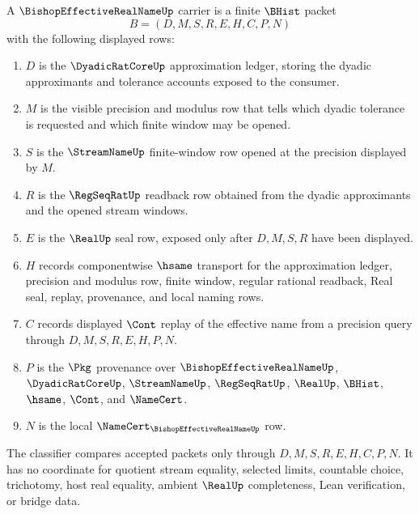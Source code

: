 \begin{definition}
\label{def:bishop-effective-real-name-carrier}
A $\BishopEffectiveRealNameUp$ carrier is a finite $\BHist$ packet
$$
B=(D,M,S,R,E,H,C,P,N)
$$
with the following displayed rows:
\begin{enumerate}
\item $D$ is the $\DyadicRatCoreUp$ approximation ledger, storing the dyadic approximants and tolerance accounts exposed to the consumer.
\item $M$ is the visible precision and modulus row that tells which dyadic tolerance is requested and which finite window may be opened.
\item $S$ is the $\StreamNameUp$ finite-window row opened at the precision displayed by $M$.
\item $R$ is the $\RegSeqRatUp$ readback row obtained from the dyadic approximants and the opened stream windows.
\item $E$ is the $\RealUp$ seal row, exposed only after $D,M,S,R$ have been displayed.
\item $H$ records componentwise $\hsame$ transport for the approximation ledger, precision and modulus row, finite window, regular rational readback, Real seal, replay, provenance, and local naming rows.
\item $C$ records displayed $\Cont$ replay of the effective name from a precision query through $D,M,S,R,E,H,P,N$.
\item $P$ is the $\Pkg$ provenance over $\BishopEffectiveRealNameUp$, $\DyadicRatCoreUp$, $\StreamNameUp$, $\RegSeqRatUp$, $\RealUp$, $\BHist$, $\hsame$, $\Cont$, and $\NameCert$.
\item $N$ is the local $\NameCert_{\BishopEffectiveRealNameUp}$ row.
\end{enumerate}
The classifier compares accepted packets only through $D,M,S,R,E,H,C,P,N$. It has no coordinate for quotient stream equality, selected limits, countable choice, trichotomy, host real equality, ambient $\RealUp$ completeness, Lean verification, or bridge data.
\end{definition}

